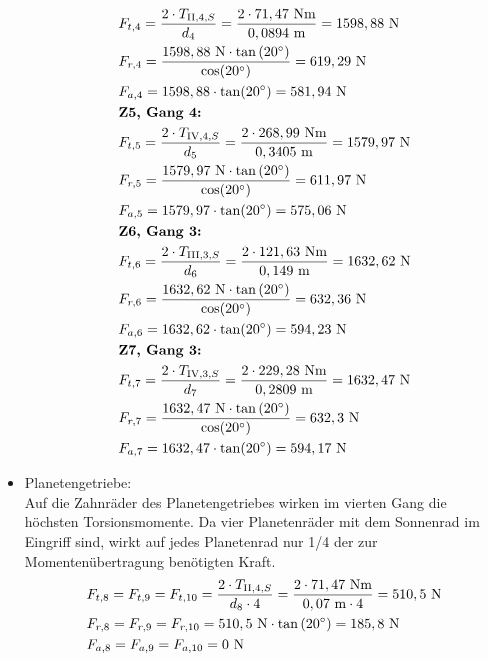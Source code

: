\begin{itemize}
\begin{align*}
	&F_{t,4} = \frac{2\cdot T_{\mathrm{II},4,S}}{d_4} = \frac{2 \cdot 71,47 \text{ Nm}}{0,0894 \text{ m}} = 1598,88 \text{ N}\\ 
	&F_{r,4} = \frac{1598,88 \text{ N} \cdot \tan{(20^\circ)}}{\cos(20^\circ)} = 619,29\text{ N}\\ 
	&F_{a,4} = 1598,88 \cdot \tan(20^\circ) = 581,94 \text{ N}\\
	&\textbf{Z5, Gang 4:} \\
	&F_{t,5} = \frac{2\cdot T_{\mathrm{IV},4,S}}{d_5} = \frac{2 \cdot 268,99 \text{ Nm}}{0,3405 \text{ m}} = 1579,97 \text{ N}\\ 
	&F_{r,5} = \frac{1579,97 \text{ N} \cdot \tan{(20^\circ)}}{\cos(20^\circ)} = 611,97\text{ N}\\ 
	&F_{a,5} = 1579,97 \cdot \tan(20^\circ) = 575,06 \text{ N}\\
	&\textbf{Z6, Gang 3:} \\
	&F_{t,6} = \frac{2\cdot T_{\mathrm{III},3,S}}{d_6} = \frac{2 \cdot 121,63 \text{ Nm}}{0,149 \text{ m}} = 1632,62 \text{ N}\\ 
	&F_{r,6} = \frac{1632,62 \text{ N} \cdot \tan{(20^\circ)}}{\cos(20^\circ)} = 632,36\text{ N}\\ 
	&F_{a,6} = 1632,62 \cdot \tan(20^\circ) = 594,23 \text{ N}\\
	&\textbf{Z7, Gang 3:} \\
	&F_{t,7} = \frac{2\cdot T_{\mathrm{IV},3,S}}{d_7} = \frac{2 \cdot 229,28 \text{ Nm}}{0,2809 \text{ m}} = 1632,47 \text{ N}\\ 
	&F_{r,7} = \frac{1632,47 \text{ N} \cdot \tan{(20^\circ)}}{\cos(20^\circ)} = 632,3\text{ N}\\ 
	&F_{a,7} = 1632,47 \cdot \tan(20^\circ) = 594,17 \text{ N}\\
\end{align*}
\item Planetengetriebe: \\
Auf die Zahnräder des Planetengetriebes wirken im vierten Gang die höchsten Torsionsmomente. Da vier Planetenräder mit dem Sonnenrad im Eingriff sind, wirkt auf jedes Planetenrad nur 1/4 der zur Momentenübertragung benötigten Kraft.
\begin{align*}
	&F_{t,8} = F_{t,9}= F_{t,10}=\frac{2\x T_{\mathrm{II},4,S}}{d_8 \x 4} = \frac{2 \x 71,47 \text{ Nm}}{0,07 \text{ m} \x 4} = 510,5 \text{ N}\\ 
	&F_{r,8} = F_{r,9}= F_{r,10}=510,5 \text{ N} \x \tan{(20^\circ)} = 185,8\text{ N}\\ 
	&F_{a,8} = F_{a,9}= F_{a,10}=0 \text{ N}\\

\end{align*}
\end{itemize}

